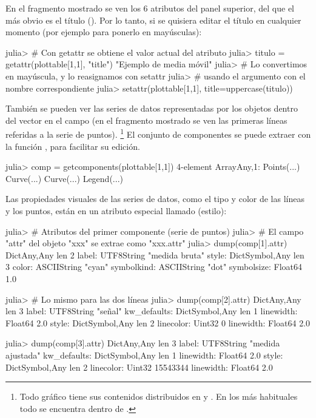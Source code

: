 En el fragmento mostrado se ven los 6 atributos del panel superior, del que el más obvio es el título (). Por lo tanto, si se quisiera editar el título en cualquier momento (por ejemplo para ponerlo en mayúsculas):

\begin{jlconcode}
julia> # Con getattr se obtiene el valor actual del atributo
julia> titulo = getattr(plottable[1,1], "title")
"Ejemplo de media móvil"
julia> # Lo convertimos en mayúscula, y lo reasignamos con setattr
julia> # usando el argumento con el nombre correspondiente
julia> setattr(plottable[1,1], title=uppercase(titulo))
\end{jlconcode}

También se pueden ver las series de datos representadas por los objetos dentro del vector  en el campo  (en el fragmento mostrado se ven las primeras líneas referidas a la serie de puntos).%
\footnote{%
Todo gráfico tiene sus contenidos distribuidos en  y
. En los más habituales todo se encuentra dentro de
.%
}
El conjunto de componentes se puede extraer con la función , para facilitar su edición.

\begin{jlconcode}
julia> comp = getcomponents(plottable[1,1])
4-element Array{Any,1}:
 Points(...)
 Curve(...) 
 Curve(...) 
 Legend(...)
\end{jlconcode}

Las propiedades visuales de las series de datos, como el tipo y color de las líneas y los puntos, están en un atributo especial llamado  (estilo):

\begin{jlconcode}
julia> # Atributos del primer componente (serie de puntos)
julia> # El campo "attr" del objeto "xxx" se extrae como "xxx.attr"
julia> dump(comp[1].attr)
Dict{Any,Any} len 2
  label: UTF8String "medida bruta"
  style: Dict{Symbol,Any} len 3
    color: ASCIIString "cyan"
    symbolkind: ASCIIString "dot"
    symbolsize: Float64 1.0

julia> # Lo mismo para las dos líneas
julia> dump(comp[2].attr)
Dict{Any,Any} len 3
  label: UTF8String "señal"
  kw_defaults: Dict{Symbol,Any} len 1
    linewidth: Float64 2.0
  style: Dict{Symbol,Any} len 2
    linecolor: Uint32 0
    linewidth: Float64 2.0

julia> dump(comp[3].attr)
Dict{Any,Any} len 3
  label: UTF8String "medida ajustada"
  kw_defaults: Dict{Symbol,Any} len 1
    linewidth: Float64 2.0
  style: Dict{Symbol,Any} len 2
    linecolor: Uint32 15543344
    linewidth: Float64 2.0
\end{jlconcode}


